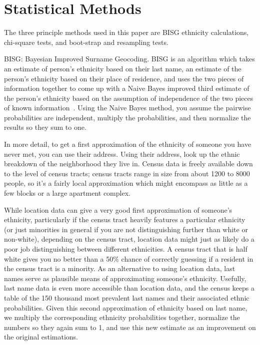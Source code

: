 \chapter{Statistical Methods}
\label{chap:statisticalmethods}
The three principle methods used in this paper are BISG ethnicity calculations, chi-square tests, and boot-strap and resampling tests.

\par BISG: Bayesian Improved Surname Geocoding.  BISG is an algorithm which takes an estimate of person's ethnicity based on their last name, an estimate of the person's ethnicity based on their place of residence, and uses the two pieces of information together to come up with a Naive Bayes improved third estimate of the person's ethnicity based on the assumption of independence of the two pieces of known information~\citep{BOOK:8}.  Using the Naive Bayes method, you assume the pairwise probabilities are independent, multiply the probabilities, and then normalize the results so they sum to one.

In more detail, to get a first approximation of the ethnicity of someone you have never met, you can use their address.  Using their address, look up the ethnic breakdown of the neighborhood they live in.  Census data is freely available down to the level of census tracts; census tracts range in size from about 1200 to 8000 people, so it’s a fairly local approximation which might encompass as little as a few blocks or a large apartment complex.

\par While location data can give a very good first approximation of someone’s ethnicity, particularly if the census tract heavily features a particular ethnicity (or just minorities in general if you are not distinguishing further than white or non-white), depending on the census tract, location data might just as likely do a poor job distinguishing between different ethnicities.  A census tract that is half white gives you no better than a 50\% chance of correctly guessing if a resident in the census tract is a minority.  As an alternative to using location data, last names serve as plausible means of approximating someone’s ethnicity.  Usefully, last name data is even more accessible than location data, and the census keeps a table of the 150 thousand most prevalent last names and their associated ethnic probabilities.  Given this second approximation of ethnicity based on last name, we multiply the corresponding ethnicity probabilities together, normalize the numbers so they again sum to 1, and use this new estimate as an improvement on the original estimations.

